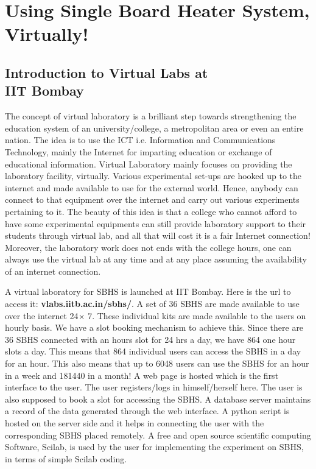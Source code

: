 \chapter{Using Single Board Heater System, Virtually!}\label{virtual}
\section{Introduction to Virtual Labs at \\IIT Bombay}
The concept of virtual laboratory is a brilliant step towards strengthening the education system of an university/college, a metropolitan area or even an entire nation. The idea is to use the ICT i.e. Information and Communications Technology, mainly the Internet for imparting education or exchange of educational information. Virtual Laboratory mainly focuses on providing the laboratory facility, virtually. Various experimental set-ups are hooked up to the internet and made available to use for the external world. Hence, anybody can connect to that equipment over the internet and carry out various experiments pertaining to it. The beauty of this idea is that a college who cannot afford to have some experimental equipments can still provide laboratory support to their students through virtual lab, and all that will cost it is a fair Internet connection! Moreover, the laboratory work does not ends with the college hours, one can always use the virtual lab at any time and at any place assuming the availability of an internet connection. 

A virtual laboratory for SBHS is launched at IIT Bombay. Here is the url to access it: {\bf vlabs.iitb.ac.in/sbhs/}. A set of 36 SBHS are made available to use over the internet 24$\times$ 7. These individual kits are made available to the users on hourly basis. We have a slot booking mechanism to achieve this. Since there are 36 SBHS connected with an hours slot for 24 hrs a day, we have 864 one hour slots a day. This means that 864 individual users can access the SBHS in a day for an hour. This also means that up to 6048 users can use the SBHS for an hour in a week and 181440 in a month! A web page is hosted which is the first interface to the user. The user registers/logs in himself/herself here. The user is also supposed to book a slot for accessing the SBHS. A database server maintains a record of the data generated through the web interface. A python script is hosted on the server side and it helps in connecting the user with the corresponding SBHS placed remotely. A free and open source scientific computing Software, Scilab, is used by the user for implementing the experiment on SBHS, in terms of simple Scilab coding. 

